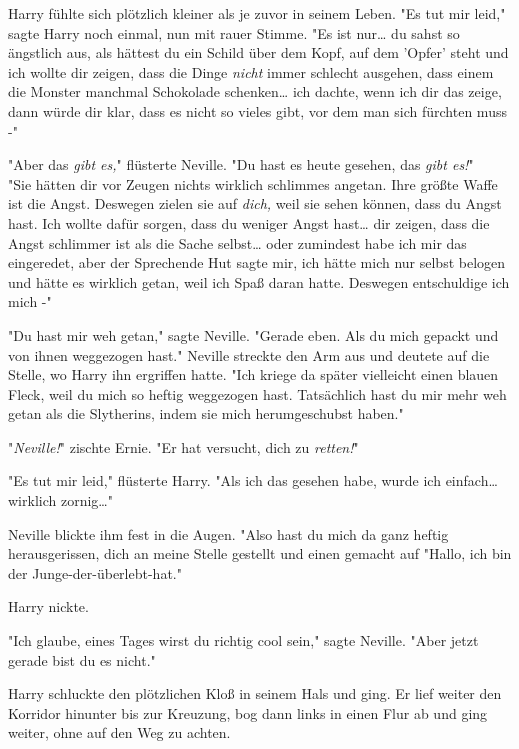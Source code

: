 {Harry fühlte sich plötzlich kleiner als je zuvor in seinem Leben. "Es tut mir leid," sagte Harry noch einmal, nun mit rauer Stimme. "Es ist nur… du sahst so ängstlich aus, als hättest du ein Schild über dem Kopf, auf dem 'Opfer' steht und ich wollte dir zeigen, dass die Dinge \emph{nicht} immer schlecht ausgehen, dass einem die Monster manchmal Schokolade schenken… ich dachte, wenn ich dir das zeige, dann würde dir klar, dass es nicht so vieles gibt, vor dem man sich fürchten muss -"

"Aber das \emph{gibt es,}" flüsterte Neville. "Du hast es heute gesehen, das \emph{gibt es!}"\\ "Sie hätten dir vor Zeugen nichts wirklich schlimmes angetan. Ihre größte Waffe ist die Angst. Deswegen zielen sie auf \emph{dich,} weil sie sehen können, dass du Angst hast. Ich wollte dafür sorgen, dass du weniger Angst hast… dir zeigen, dass die Angst schlimmer ist als die Sache selbst… oder zumindest habe ich mir das eingeredet, aber der Sprechende Hut sagte mir, ich hätte mich nur selbst belogen und hätte es wirklich getan, weil ich Spaß daran hatte. Deswegen entschuldige ich mich -"

"Du hast mir weh getan," sagte Neville. "Gerade eben. Als du mich gepackt und von ihnen weggezogen hast." Neville streckte den Arm aus und deutete auf die Stelle, wo Harry ihn ergriffen hatte. "Ich kriege da später vielleicht einen blauen Fleck, weil du mich so heftig weggezogen hast. Tatsächlich hast du mir mehr weh getan als die Slytherins, indem sie mich herumgeschubst haben."

"\emph{Neville!}" zischte Ernie. "Er hat versucht, dich zu \emph{retten!}"

"Es tut mir leid," flüsterte Harry. "Als ich das gesehen habe, wurde ich einfach… wirklich zornig…"

Neville blickte ihm fest in die Augen. "Also hast du mich da ganz heftig herausgerissen, dich an meine Stelle gestellt und einen gemacht auf "Hallo, ich bin der Junge-der-überlebt-hat."

Harry nickte.

"Ich glaube, eines Tages wirst du richtig cool sein," sagte Neville. "Aber jetzt gerade bist du es nicht."

Harry schluckte den plötzlichen Kloß in seinem Hals und ging. Er lief weiter den Korridor hinunter bis zur Kreuzung, bog dann links in einen Flur ab und ging weiter, ohne auf den Weg zu achten.

}

